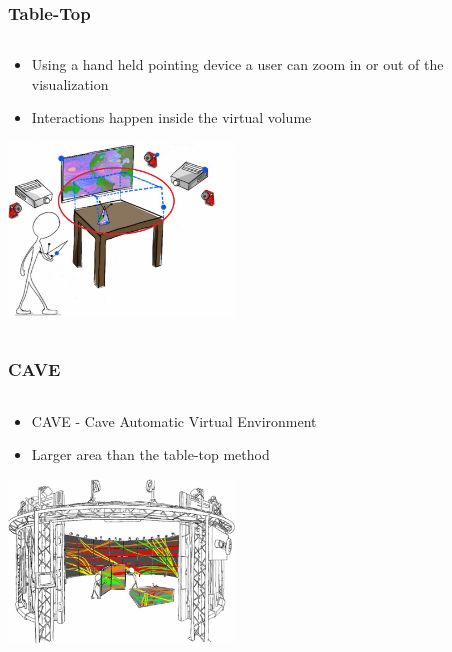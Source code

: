 \documentclass{beamer}
\begin{document}
\begin{frame}
\frametitle{Table-Top} 
	\begin{columns}
    \begin{column}{0.9\textwidth}
    \begin{itemize}
		\item Using a hand held pointing device a user can zoom in or out of the visualization 
		\item Interactions happen inside the virtual volume
	\end{itemize}
	\begin{center}

	\includegraphics[width=6cm]{images/TabletopVV}
	
	\cite{3D}
	\end{center}
	\end{column}
    \end{columns}
\end{frame}

\begin{frame}
\frametitle{CAVE}
	\begin{columns}
    \begin{column}{0.7\textwidth}
    \begin{itemize}
		\item CAVE - Cave Automatic Virtual Environment 
		\item Larger area than the table-top method
	\end{itemize}
	\begin{center}
	\includegraphics[width=6cm]{../Sample_paper/images/CAVE}
		
	\cite{3D}
	\end{center}
	\end{column}
    \end{columns}
\end{frame}
\end{document}
